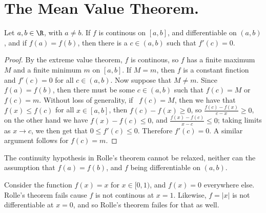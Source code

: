 
\section{The Mean Value Theorem.}

\begin{lemma}\label{4.3.1}
    Let $a,b \in \R$, with  $a \neq b$. If  $f$ is continous on  $[a,b]$, and differentiable on 
    $(a,b)$, and if  $f(a)=f(b)$, then there is a  $c \in (a,b)$ such that $f'(c)=0$.
\end{lemma}
\begin{proof}
    By the extreme value theorem,  $f$ is continous, so  $f$ has a finite maximum  $M$ and 
    a finite minimum  $m$ on  $[a,b]$. If  $M=m$, then  $f$ is a constant finction and 
    $f'(c)=0$ for all  $c \in (a,b)$. Now suppose that $M \neq m$. Since $f(a)=f(b)$, then there 
    must be some  $c \in (a,b)$ such that $f(c)=M$ or  $f(c)=m$. Without loss of generality, if \
    $f(c)=M$, then we have that $f(x) \leq f(c)$ for all  $x \in [a,b]$, then 
    $f(c)-f(x) \geq 0$, so $ \frac{f(c)-f(x)}{c-x} \geq 0$, on the other hand we have 
    $f(x)-f(c) \leq 0$, and  $\frac{f(x)-f(c)}{x-c} \leq 0$; taking limits as $x \rightarrow c$, we 
    then get that  $0 \leq f'(c) \leq 0$. Therefore  $f'(c)=0$. A similar argument follows 
    for  $f(c)=m$.
\end{proof}

\begin{remark} 
    The continuity hypothesis in Rolle's theorem cannot be relaxed, neither can the 
    assumption that $f(a)=f(b)$, and  $f$ being differentiable on  $(a,b)$.
\end{remark}

\begin{example}
    Consider the function $f(x)=x$ for  $x \in [0,1)$, and $f(x)=0$ everywhere else. 
    Rolle's theorem fails cause $f$ is not continous at  $x=1$. Likewise,  $f=|x|$ is 
    not differentiable at  $x=0$, and so Rolle's theorem failes for that as well.
\end{example} 

